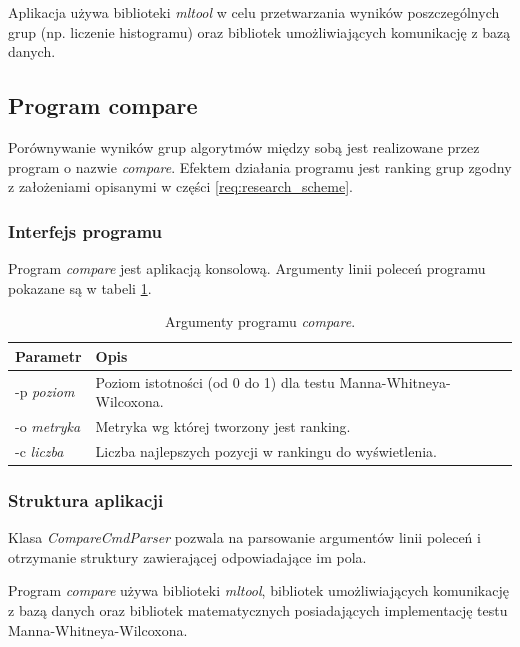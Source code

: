 \documentclass[../thesis.tex]{subfiles}
\begin{document}
Aplikacja używa biblioteki \emph{mltool} w celu przetwarzania wyników poszczególnych grup (np. liczenie histogramu) oraz bibliotek umożliwiających komunikację z bazą danych.

\subsection{Program compare}

Porównywanie wyników grup algorytmów między sobą jest realizowane przez program o nazwie \emph{compare}. Efektem działania programu jest ranking grup zgodny z założeniami opisanymi w części \ref{req:research_scheme}.

\subsubsection{Interfejs programu}

Program \emph{compare} jest aplikacją konsolową. Argumenty linii poleceń programu pokazane są w tabeli \ref{proj:table_compare_args}.

\begin{table}[h]
\begin{center}
\begin{tabular}{ | l | p{110mm} | }
\hline
\rowcolor{lightgray} Parametr & Opis \\\hline

-p \emph{poziom} & Poziom istotności (od 0 do 1) dla testu Manna-Whitneya-Wilcoxona.\\\hline
-o \emph{metryka} & Metryka wg której tworzony jest ranking.\\\hline
-c \emph{liczba} & Liczba najlepszych pozycji w rankingu do wyświetlenia.\\\hline

\end{tabular}
\caption{Argumenty programu \emph{compare}.}
\label{proj:table_compare_args}
\end{center}
\end{table}

\subsubsection{Struktura aplikacji}

Klasa \emph{CompareCmdParser} pozwala na parsowanie argumentów linii poleceń i otrzymanie struktury zawierającej odpowiadające im pola. 

Program \emph{compare} używa biblioteki \emph{mltool}, bibliotek umożliwiających komunikację z bazą danych oraz bibliotek matematycznych posiadających implementację testu Manna-Whitneya-Wilcoxona.
\end{document}
